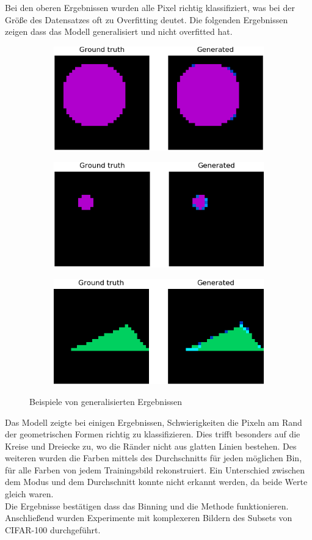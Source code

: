Bei den oberen Ergebnissen wurden alle Pixel richtig klassifiziert, was bei der Größe des Datensatzes oft zu Overfitting deutet.
Die folgenden Ergebnissen zeigen dass das Modell generalisiert und nicht overfitted hat.

\begin{figure}[H]
  \vspace{1cm}
  \begin{subfigure}
    \centering
    \includegraphics[width=.32\textwidth]{resources/experiments/581.png}
  \end{subfigure}
  \begin{subfigure}
    \centering
    \includegraphics[width=.32\textwidth]{resources/experiments/712.png}
  \end{subfigure}
  \begin{subfigure}
    \centering
    \includegraphics[width=.32\textwidth]{resources/experiments/761.png}
  \end{subfigure}
  \caption{Beispiele von generalisierten Ergebnissen}
  \label{image:nicht-gute-ergebnisse-toy-dataset}
\end{figure}

Das Modell zeigte bei einigen Ergebnissen, Schwierigkeiten die Pixeln am Rand der geometrischen Formen richtig zu klassifizieren.
Dies trifft besonders auf die Kreise und Dreiecke zu, wo die Ränder nicht aus glatten Linien bestehen. Des weiteren wurden die Farben mittels
des Durchschnitts für jeden möglichen Bin, für alle Farben von jedem Trainingsbild rekonstruiert. Ein Unterschied zwischen dem Modus und dem 
Durchschnitt konnte nicht erkannt werden, da beide Werte gleich waren.
\\
Die Ergebnisse bestätigen dass das Binning und die Methode funktionieren. Anschließend wurden Experimente mit komplexeren Bildern
des Subsets von CIFAR-100 durchgeführt.

